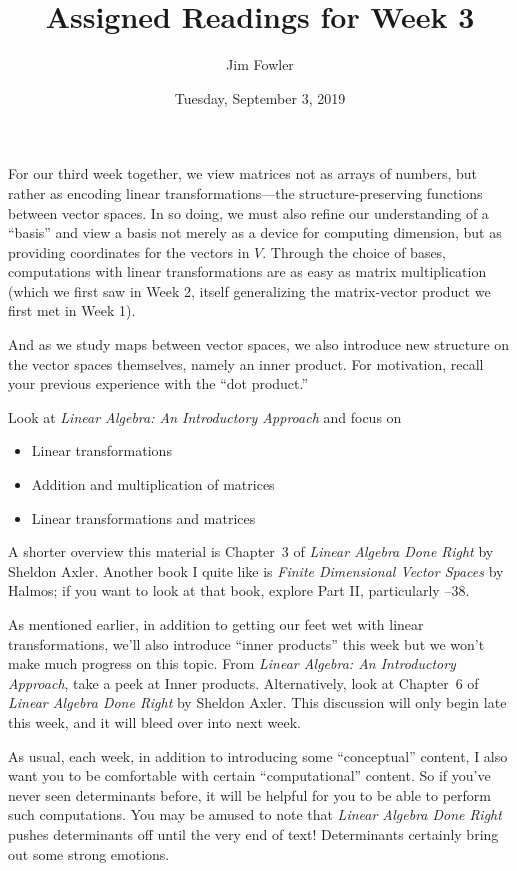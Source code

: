 \documentclass{homework}
\author{Jim Fowler}
\title{Assigned Readings for Week 3}
\date{Tuesday, September 3, 2019}
\begin{document}
\maketitle

For our third week together, we view matrices not as arrays of
numbers, but rather as encoding linear transformations---the
structure-preserving functions between vector spaces.  In so doing, we
must also refine our understanding of a ``basis'' and view a basis not
merely as a device for computing dimension, but as providing
coordinates for the vectors in $V$.  Through the choice of bases,
computations with linear transformations are as easy as matrix
multiplication (which we first saw in Week 2, itself generalizing the
matrix-vector product we first met in Week 1).

And as we study maps between vector spaces, we also introduce new
structure on the vector spaces themselves, namely an inner product.
For motivation, recall your previous experience with the ``dot
product.''

Look at \textit{Linear Algebra: An Introductory Approach} and focus on
\begin{itemize}
\item {} Linear transformations
\item {} Addition and multiplication of matrices
\item {} Linear transformations and matrices
\end{itemize}
A shorter overview this material is Chapter~3 of \textit{Linear
  Algebra Done Right} by Sheldon Axler.  Another book I quite like is
\textit{Finite Dimensional Vector Spaces} by Halmos; if you want to
look at that book, explore Part II, particularly --38.

As mentioned earlier, in addition to getting our feet wet with linear
transformations, we'll also introduce ``inner products'' this week but
we won't make much progress on this topic.  From \textit{Linear
  Algebra: An Introductory Approach}, take a peek at 
Inner products.  Alternatively, look at Chapter~6 of \textit{Linear
  Algebra Done Right} by Sheldon Axler.  This discussion will only
begin late this week, and it will bleed over into next week.

As usual, each week, in addition to introducing some ``conceptual''
content, I also want you to be comfortable with certain
``computational'' content.  So if you've never seen determinants
before, it will be helpful for you to be able to perform such
computations.  You may be amused to note that \textit{Linear Algebra
  Done Right} pushes determinants off until the very end of text!
Determinants certainly bring out some strong emotions.
\end{document}

